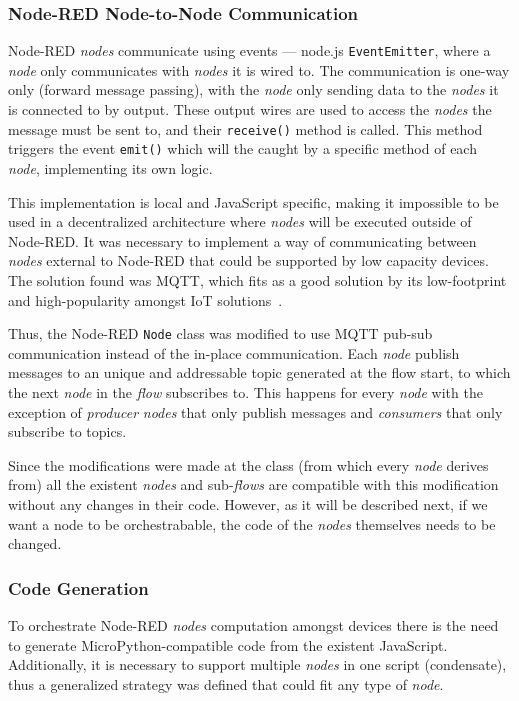 \subsubsection{Node-RED Node-to-Node Communication}\label{sec:mqtt_support}

Node-RED \textit{nodes} communicate using events --- node.js \texttt{EventEmitter}, where a \textit{node} only communicates with \textit{nodes} it is wired to. The communication is one-way only (forward message passing), with the \textit{node} only sending data to the \textit{nodes} it is connected to by output. These output wires are used to access the \textit{nodes} the message must be sent to, and their \texttt{receive()} method is called. This method triggers the event \texttt{emit()} which will the caught by a specific method of each \textit{node}, implementing its own logic.

This implementation is local and JavaScript specific, making it impossible to be used in a decentralized architecture where \textit{nodes} will be executed outside of Node-RED. It was necessary to implement a way of communicating between \textit{nodes} external to Node-RED that could be supported by low capacity devices. The solution found was MQTT, which fits as a good solution by its low-footprint and high-popularity amongst IoT solutions~\cite{soni2017survey}.

Thus, the Node-RED \texttt{Node} class was modified to use MQTT pub-sub communication instead of the in-place communication. Each \textit{node} publish messages to an unique and addressable topic generated at the flow start, to which the next \textit{node} in the \textit{flow} subscribes to. This happens for every \textit{node} with the exception of \textit{producer} \textit{nodes} that only publish messages and \textit{consumers} that only subscribe to topics.

Since the modifications were made at the class (from which every \textit{node} derives from) all the existent \textit{nodes} and sub-\textit{flows} are compatible with this modification without any changes in their code. However, as it will be described next, if we want a node to be orchestrabable, the code of the \textit{nodes} themselves needs to be changed.

\subsubsection{Code Generation}\label{sec:code_generation}

To orchestrate Node-RED \textit{nodes} computation amongst devices there is the need to generate MicroPython-compatible code from the existent JavaScript. Additionally, it is necessary to support multiple \textit{nodes} in one script (\ie condensate), thus a generalized strategy was defined that could fit any type of \textit{node}.

